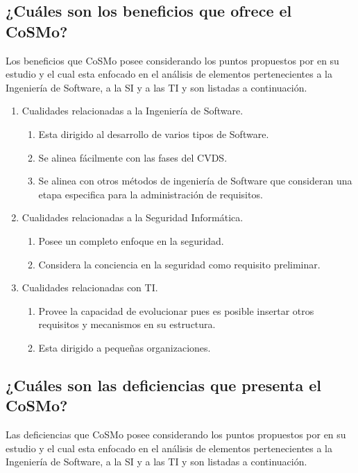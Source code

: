 \documentclass[runningheads,a4paper]{llncs}
\begin{document}
\subsection{¿Cuáles son los beneficios que ofrece el \gls{CoSMo}?}
Los beneficios que \gls{CoSMo} posee considerando los puntos propuestos por \cite{BenchmarkingSDLCLAPS} en su estudio y el cual esta enfocado en el análisis de elementos pertenecientes a la Ingeniería de \gls{Software}, a la \gls{SI} y a las \gls{TI} y son listadas a continuación.

\begin{enumerate}
	\item Cualidades relacionadas a la Ingeniería de \gls{Software}.
		\begin{enumerate}
			\item Esta dirigido al desarrollo de varios tipos de \gls{Software}.
			\item Se alinea fácilmente con las fases del \gls{CVDS}.
			\item Se alinea con otros métodos de ingeniería de \gls{Software} que consideran una etapa especifica para la administración de requisitos.\\
			
		\end{enumerate}
	\item Cualidades relacionadas a la Seguridad Informática.
		\begin{enumerate}
			\item Posee un completo enfoque en la seguridad.
			\item Considera la conciencia en la seguridad como requisito preliminar.\\

		\end{enumerate}
	\item Cualidades relacionadas con \gls{TI}.
		\begin{enumerate} 
			\item Provee la capacidad de evolucionar pues es posible insertar otros requisitos y mecanismos en su estructura.
			\item Esta dirigido a pequeñas organizaciones.\\
		\end{enumerate}
\end{enumerate}

\subsection{¿Cuáles son las deficiencias que presenta el \gls{CoSMo}?}
Las deficiencias que \gls{CoSMo} posee considerando los puntos propuestos por \cite{BenchmarkingSDLCLAPS} en su estudio y el cual esta enfocado en el análisis de elementos pertenecientes a la Ingeniería de \gls{Software}, a la \gls{SI} y a las \gls{TI} y son listadas a continuación.
\end{document}
